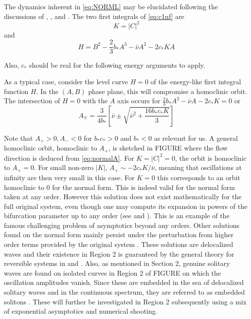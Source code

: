 The dynamics inherent in \eqref{eq:NORML} may be elucidated following the discussions of \cite{IA}, \cite{IK}, \cite{Lombardi1} and \cite{Lombardi2}.
The two first integrals of \eqref{eq:c1nf}  are
\begin{equation}
K = \left| C \right|^2
\end{equation}
and
\begin{equation}
H = B^2 - \frac{2}{3} b_* A^3 - \bar{\nu} A^2 - 2 c_* K A
\end{equation}

Also, $c_*$ should be real  for the following energy arguments to apply.

As a typical case, consider  the level curve $H=0$ of the energy-like first integral function $H$. In the $(A,B)$ phase plane,
this will compromise a homoclinic orbit. The intersection of $H=0$ with the $A$ axis occurs for $ \frac{2}{3} b_* A^2 - \bar{\nu}A - 2 c_* K = 0$ or
\begin{equation}
A_{\mp} = \frac{3}{4 b_*} \left[ \bar{\nu} \pm \sqrt{ \bar{\nu}^2 + \frac{16 b_* c_* K}{3} } \right]
\end{equation}

Note that $A_+ > 0, A_- < 0 $ for $b_* c_* > 0 $ and $b_* < 0$ as relevant for us. A general homoclinic orbit, homoclinic to $A_+$, is sketched
in FIGURE where the flow direction is deduced from \eqref{eq:normalA}.
For $K=\left|C\right|^2 = 0 $, the orbit is homoclinic to $A_+=0$. For small non-zero $\left|K\right|$, $ A_+ \sim - 2 c_* K / \bar{\nu}$, meaning that
oscillations at infinity are then very small in this case. For $K=0$ this corresponds to an orbit homoclinic to 0 for the normal form. This is indeed valid for
the normal form taken at any order. However this solution does not exist mathematically for the full original system, even though
one may compute its expansion in powers of the bifurcation parameter up to any order (see \cite{Lombardi1} and \cite{Lombardi2}). This is an example
of the famous challenging problem of asymptotics beyond any orders. Other solutions found on the normal form mainly persist under the perturbation from
higher order terms provided by the original system \cite{IK}. These solutions are delocalized waves and their existence in Region 2 is guaranteed
by the general theory for reversible systems in \cite{Lombardi1} and \cite{Lombardi2}. Also, as mentioned in Section 2, genuine solitary waves are found on isolated
curves in Region 2 of FIGURE on which the oscillation amplitudes vanish. Since these are embedded in the sea of delocalized solitary waves and in the 
continuous spectrum, they are referred to as embedded solitons \cite{CMYK}. These will further be investigated in Region 2 subsequently using a mix of
exponential asymptotics and numerical shooting.


